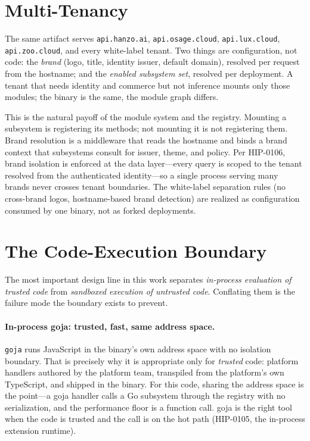 \documentclass[11pt]{article}
\begin{document}
\section{Multi-Tenancy}
\label{sec:multitenancy}

The same artifact serves \texttt{api.hanzo.ai}, \texttt{api.osage.cloud},
\texttt{api.lux.cloud}, \texttt{api.zoo.cloud}, and every white-label
tenant. Two things are configuration, not code: the \emph{brand} (logo,
title, identity issuer, default domain), resolved per request from the
hostname; and the \emph{enabled subsystem set}, resolved per deployment.
A tenant that needs identity and commerce but not inference mounts only
those modules; the binary is the same, the module graph differs.

This is the natural payoff of the module system and the registry. Mounting
a subsystem is registering its methods; not mounting it is not registering
them. Brand resolution is a middleware that reads the hostname and binds a
brand context that subsystems consult for issuer, theme, and policy. Per
HIP-0106, brand isolation is enforced at the data layer---every query is
scoped to the tenant resolved from the authenticated identity---so a single
process serving many brands never crosses tenant boundaries. The
white-label separation rules (no cross-brand logos, hostname-based brand
detection) are realized as configuration consumed by one binary, not as
forked deployments.

\section{The Code-Execution Boundary}
\label{sec:boundary}

The most important design line in this work separates \emph{in-process
evaluation of trusted code} from \emph{sandboxed execution of untrusted
code}. Conflating them is the failure mode the boundary exists to prevent.

\paragraph{In-process goja: trusted, fast, same address space.}
\texttt{goja} runs JavaScript in the binary's own address space with no
isolation boundary. That is precisely why it is appropriate only for
\emph{trusted} code: platform handlers authored by the platform team,
transpiled from the platform's own TypeScript, and shipped in the binary.
For this code, sharing the address space is the point---a goja handler
calls a Go subsystem through the registry with no serialization, and the
performance floor is a function call. goja is the right tool when the code
is trusted and the call is on the hot path (HIP-0105, the in-process
extension runtime).
\end{document}
